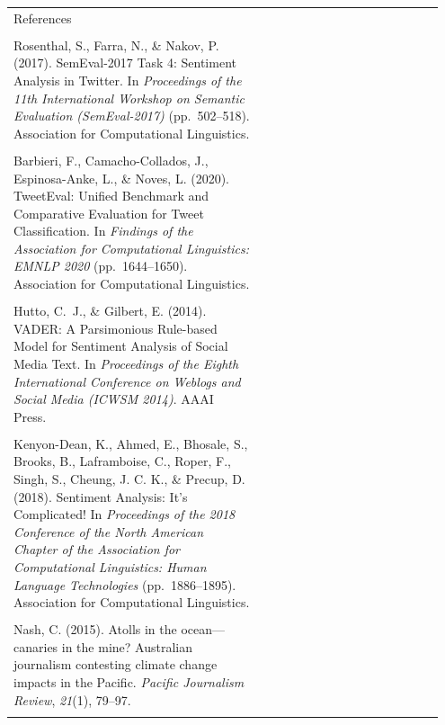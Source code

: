 \documentclass[11pt]{article}
\begin{document}
\begin{longtable}{|p{0.55\linewidth}|p{0.40\linewidth}|}
\hline
\rule{0pt}{3.5cm} & \\
\hline
References & \\[2pt]
\hline
\rule{0pt}{3.5cm} & \\
\hline
Rosenthal, S., Farra, N., \& Nakov, P. (2017). SemEval-2017 Task 4: Sentiment Analysis in Twitter. In \textit{Proceedings of the 11th International Workshop on Semantic Evaluation (SemEval-2017)} (pp.\ 502--518). Association for Computational Linguistics. & \\[2pt]
\hline
\rule{0pt}{3.5cm} & \\
\hline
Barbieri, F., Camacho-Collados, J., Espinosa-Anke, L., \& Noves, L. (2020). TweetEval: Unified Benchmark and Comparative Evaluation for Tweet Classification. In \textit{Findings of the Association for Computational Linguistics: EMNLP 2020} (pp.\ 1644--1650). Association for Computational Linguistics. & \\[2pt]
\hline
\rule{0pt}{3.5cm} & \\
\hline
Hutto, C.~J., \& Gilbert, E. (2014). VADER: A Parsimonious Rule-based Model for Sentiment Analysis of Social Media Text. In \textit{Proceedings of the Eighth International Conference on Weblogs and Social Media (ICWSM 2014)}. AAAI Press. & \\[2pt]
\hline
\rule{0pt}{3.5cm} & \\
\hline
Kenyon-Dean, K., Ahmed, E., Bhosale, S., Brooks, B., Laframboise, C., Roper, F., Singh, S., Cheung, J. C. K., \& Precup, D. (2018). Sentiment Analysis: It's Complicated! In \textit{Proceedings of the 2018 Conference of the North American Chapter of the Association for Computational Linguistics: Human Language Technologies} (pp.\ 1886--1895). Association for Computational Linguistics. & \\[2pt]
\hline
\rule{0pt}{3.5cm} & \\
\hline
Nash, C. (2015). Atolls in the ocean---canaries in the mine? Australian journalism contesting climate change impacts in the Pacific. \textit{Pacific Journalism Review}, \textit{21}(1), 79--97. & \\[2pt]
\hline
\rule{0pt}{3.5cm} & \\
\hline
\end{longtable}
\end{document}
